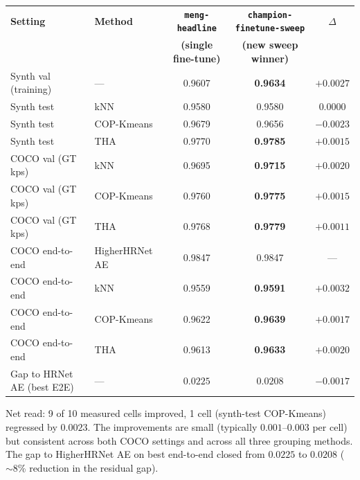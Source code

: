 \begin{tabular}{llccc}
\hline
\textbf{Setting} & \textbf{Method} & \textbf{\texttt{meng-headline}} & \textbf{\texttt{champion-finetune-sweep}} & \textbf{$\Delta$} \\
                 &                  & \textbf{(single fine-tune)}      & \textbf{(new sweep winner)}                & \\
\hline
Synth val (training)            & ---          & 0.9607          & \textbf{0.9634} & $+0.0027$ \\
\hline
Synth test                      & kNN          & 0.9580          & 0.9580          & $0.0000$  \\
Synth test                      & COP-Kmeans   & 0.9679          & 0.9656          & $-0.0023$ \\
Synth test                      & THA          & 0.9770          & \textbf{0.9785} & $+0.0015$ \\
\hline
COCO val (GT kps)               & kNN          & 0.9695          & \textbf{0.9715} & $+0.0020$ \\
COCO val (GT kps)               & COP-Kmeans   & 0.9760          & \textbf{0.9775} & $+0.0015$ \\
COCO val (GT kps)               & THA          & 0.9768          & \textbf{0.9779} & $+0.0011$ \\
\hline
COCO end-to-end                 & HigherHRNet AE & 0.9847         & 0.9847          & ---       \\
COCO end-to-end                 & kNN          & 0.9559          & \textbf{0.9591} & $+0.0032$ \\
COCO end-to-end                 & COP-Kmeans   & 0.9622          & \textbf{0.9639} & $+0.0017$ \\
COCO end-to-end                 & THA          & 0.9613          & \textbf{0.9633} & $+0.0020$ \\
\hline
Gap to HRNet AE (best E2E)      & ---          & $0.0225$        & $\mathbf{0.0208}$ & $-0.0017$ \\
\hline
\end{tabular}

\vspace{0.5em}

Net read: 9 of 10 measured cells improved, 1 cell (synth-test COP-Kmeans) regressed by $0.0023$. The improvements are small (typically $0.001$--$0.003$ per cell) but consistent across both COCO settings and across all three grouping methods. The gap to HigherHRNet AE on best end-to-end closed from $0.0225$ to $0.0208$ ($\sim 8$\% reduction in the residual gap).

